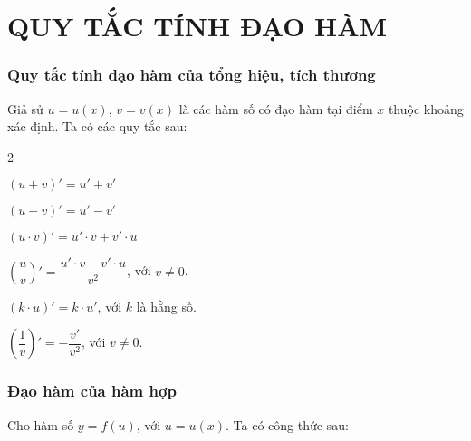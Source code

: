 \section{QUY TẮC TÍNH ĐẠO HÀM}

\subsubsection{Quy tắc tính đạo hàm của tổng hiệu, tích thương}
Giả sử $u=u(x)$, $v=v(x)$ là các hàm số có đạo hàm tại điểm $x$ thuộc khoảng xác định. Ta có các quy tắc sau:
\begin{tcolorbox}[colframe=cyan,colback=red!1!white,boxrule=0.3mm]
	\begin{itemize}
	\end{itemize}
\end{tcolorbox}

\subsubsection{Đạo hàm của hàm hợp}
Cho hàm số $y=f(u)$, với $u=u(x)$. Ta có công thức sau:

